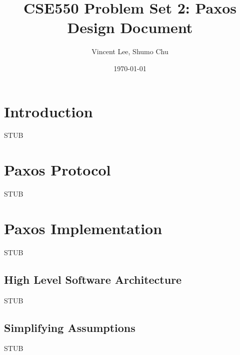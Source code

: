 \documentclass[11pt, onecolumn]{article}
\begin{document}
\title{CSE550 Problem Set 2: Paxos Design Document}
\author{Vincent Lee, Shumo Chu}
\date{\today}

\maketitle

\tableofcontents


\section{Introduction}

STUB


\section{Paxos Protocol}

STUB


\section{Paxos Implementation}

STUB

\subsection{High Level Software Architecture}

STUB

\subsection{Simplifying Assumptions}

STUB

\end{document}
